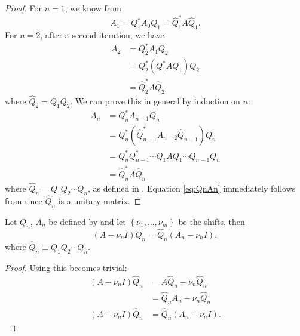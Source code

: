\begin{proof}
    For $n=1$, we know from  
    \begin{equation}
        A_1 = Q_1^*A_0Q_1 = \hat{Q}_1^*A \hat{Q}_1.
    \end{equation}
    For $n=2$, after a second iteration, we have
    \begin{equation}
        \begin{split}
            A_2 &= Q_2^*A_1Q_2 \\
             &= Q_2^*\left( Q_1^*A Q_1 \right)Q_2 \\
             &= \hat{Q}_2^*A \hat{Q}_2
        \end{split}
    \end{equation}
    where $\hat{Q}_2 = Q_1Q_2$.  We can prove this in general by induction on $n$:
    \begin{equation}
        \begin{split}
            A_n &= Q_n^*A_{n-1}Q_n \\
            &= Q_n^*\left( \hat{Q}_{n-1}^*A_{n-2} \hat{Q}_{n-1} \right)Q_n \\
             &= Q_n^*Q_{n-1}^*\cdots Q_1 A Q_1\cdots Q_{n-1}Q_n \\
             &= \hat{Q}_n^*A \hat{Q}_n
        \end{split}
    \end{equation}
    where $\hat{Q}_n = Q_1Q_2\cdots Q_n$, as defined in .  Equation \eqref{eq:QnAn} immediately follows from  since $\hat{Q}_n$ is a unitary matrix.
\end{proof}

\begin{lem}
    Let $Q_n$, $A_n$ be defined by  and let $\left\{\nu_1,\ldots, \nu_m\right\}$ be the shifts, then
    \begin{equation}
        \left(A-\nu_nI\right)\hat{Q}_n = \hat{Q}_n\left(A_n - \nu_nI\right),
    \end{equation}
    where $\hat{Q}_n \equiv Q_1Q_2\cdots Q_n$.
\end{lem}

\begin{proof}
    Using  this becomes trivial:
    \begin{equation}
        \begin{split}
            \left(A-\nu_nI\right)\hat{Q}_n &= A\hat{Q}_n - \nu_n\hat{Q}_n \\
             &= \hat{Q}_nA_n - \nu_n\hat{Q}_n \\
             \left(A-\nu_nI\right)\hat{Q}_n &= \hat{Q}_n\left( A_n - \nu_nI \right).
        \end{split}
    \end{equation}
\end{proof}

